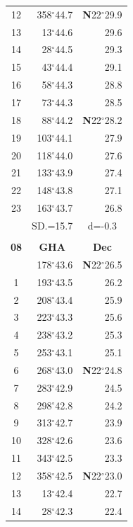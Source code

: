 \documentclass[10pt, a4paper]{report}
\begin{document}
\begin{scriptsize}
\begin{tabular*}{0.2\textwidth}[t]{@{\extracolsep{\fill}}|c|rr|}
12 & 358$^\circ$44.7 & \textbf{N}22$^\circ$29.9\\
13 & 13$^\circ$44.6 & 29.6\\
14 & 28$^\circ$44.5 & 29.3\\
15 & 43$^\circ$44.4 & \raisebox{0.24ex}{\boldmath$\cdot$~\boldmath$\cdot$~~}29.1\\
16 & 58$^\circ$44.3 & 28.8\\
17 & 73$^\circ$44.3 & 28.5\\[2Pt]
18 & 88$^\circ$44.2 & \textbf{N}22$^\circ$28.2\\
19 & 103$^\circ$44.1 & 27.9\\
20 & 118$^\circ$44.0 & 27.6\\
21 & 133$^\circ$43.9 & \raisebox{0.24ex}{\boldmath$\cdot$~\boldmath$\cdot$~~}27.4\\
22 & 148$^\circ$43.8 & 27.1\\
23 & 163$^\circ$43.7 & 26.8\\
\hline
\rule{0pt}{2.4ex} & \multicolumn{1}{c}{SD.=15.7} & \multicolumn{1}{c|}{d=-0.3}\\
\hline
\multicolumn{1}{c}{}\\[-0.5ex]\hline
\multicolumn{1}{|c|}{\rule{0pt}{2.6ex}\textbf{08}} & \multicolumn{1}{c}{\textbf{GHA}} & \multicolumn{1}{c|}{\textbf{Dec}}\\
\hline\rule{0pt}{2.6ex}\noindent
0 & 178$^\circ$43.6 & \textbf{N}22$^\circ$26.5\\
1 & 193$^\circ$43.5 & 26.2\\
2 & 208$^\circ$43.4 & 25.9\\
3 & 223$^\circ$43.3 & \raisebox{0.24ex}{\boldmath$\cdot$~\boldmath$\cdot$~~}25.6\\
4 & 238$^\circ$43.2 & 25.3\\
5 & 253$^\circ$43.1 & 25.1\\[2Pt]
6 & 268$^\circ$43.0 & \textbf{N}22$^\circ$24.8\\
7 & 283$^\circ$42.9 & 24.5\\
8 & 298$^\circ$42.8 & 24.2\\
9 & 313$^\circ$42.7 & \raisebox{0.24ex}{\boldmath$\cdot$~\boldmath$\cdot$~~}23.9\\
10 & 328$^\circ$42.6 & 23.6\\
11 & 343$^\circ$42.5 & 23.3\\[2Pt]
12 & 358$^\circ$42.5 & \textbf{N}22$^\circ$23.0\\
13 & 13$^\circ$42.4 & 22.7\\
14 & 28$^\circ$42.3 & 22.4\\

\end{tabular*}
\end{scriptsize}
\end{document}
